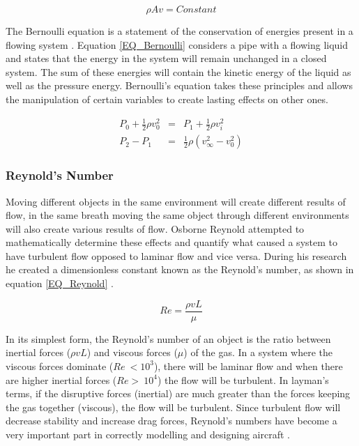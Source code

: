 \begin{equation}
\label{EQ_BernoulliP}
\rho Av = Constant
\end{equation} 

The Bernoulli equation is a statement of the conservation of energies present in a flowing system \cite{Dayle}. Equation \ref{EQ_Bernoulli} considers a pipe with a flowing liquid and states that the energy in the system will remain unchanged in a closed system. The sum of these energies will contain the kinetic energy of the liquid as well as the pressure energy. Bernoulli's equation takes these principles and allows the manipulation of certain variables to create lasting effects on other ones.

\begin{eqnarray}
P_0 + \frac{1}{2} \rho v_0^2 &=& P_1 + \frac{1}{2} \rho v_i^2\label{EQ_Bernoulli}\\
P_2 - P_1 &=& \frac{1}{2} \rho (v_\infty^2 - v_0^2)\label{EQ_Bernoulli2}
\end{eqnarray}

\subsubsection{Reynold's Number}
Moving different objects in the same environment will create different results of flow, in the same breath moving the same object through different environments will also create various results of flow. Osborne Reynold attempted to mathematically determine these effects and quantify what caused a system to have turbulent flow opposed to laminar flow and vice versa. During his research he created a dimensionless constant known as the Reynold's number, as shown in equation \ref{EQ_Reynold} \cite{Reynold}. 

\begin{equation}
\label{EQ_Reynold}
Re = \frac{\rho v L}{\mu}
\end{equation} 

In its simplest form, the Reynold's number of an object is the ratio between inertial forces ($\rho v L$) and viscous forces ($\mu$) of the gas. In a system where the viscous forces dominate ($Re ~< 10^3$), there will be laminar flow and when there are higher inertial forces ($Re >~ 10^4$) the flow will be turbulent. In layman's terms, if the disruptive forces (inertial) are much greater than the forces keeping the gas together (viscous), the flow will be turbulent. 
Since turbulent flow will decrease stability and increase drag forces, Reynold's numbers have become a very important part in correctly modelling and designing aircraft \cite{Reynold}.


